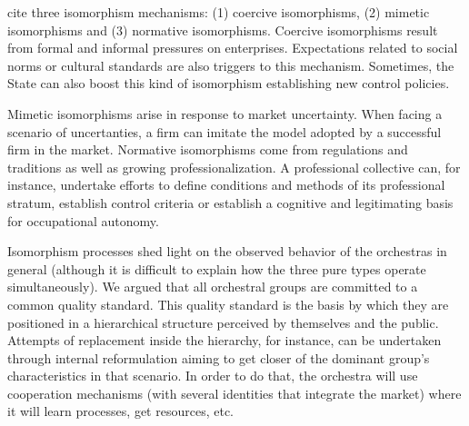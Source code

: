 \documentclass[a4paper, 12pt, openright, oneside, german, french, brazil, english, article]{abntex2}
\begin{document}
	 cite three isomorphism mechanisms: (1) coercive isomorphisms, (2) mimetic isomorphisms and (3) normative isomorphisms. Coercive isomorphisms result from formal and informal pressures on enterprises. Expectations related to social norms or cultural standards are also triggers to this mechanism. Sometimes, the State can also boost this kind of isomorphism establishing new control policies.
	
	
	Mimetic isomorphisms arise in response to market uncertainty. When facing a scenario of uncertanties, a firm can imitate the model adopted by a successful firm in the market. Normative isomorphisms come from regulations and traditions as well as growing professionalization. A professional collective can, for instance, undertake efforts to define conditions and methods of its professional stratum, establish control criteria or establish a cognitive and legitimating basis for occupational autonomy.
	
	
	Isomorphism processes shed light on the observed behavior of the orchestras in general (although it is difficult to explain how the three pure types operate simultaneously). We argued that all orchestral groups are committed to a common quality standard. This quality standard is the basis by which they are positioned in a hierarchical structure perceived by themselves and the public. Attempts of replacement inside the hierarchy, for instance, can be undertaken through internal reformulation aiming to get closer of the dominant group's characteristics in that scenario. In order to do that, the orchestra will use cooperation mechanisms (with several identities that integrate the market) where it will learn processes, get resources, etc.
	
\end{document}
